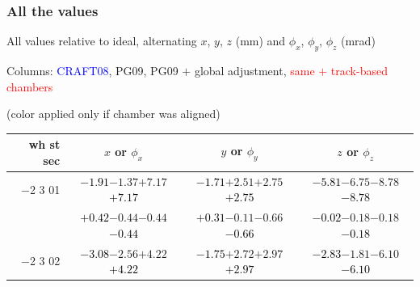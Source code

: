 \documentclass[compress]{beamer}
\begin{document}
\begin{frame}
\frametitle{All the values}
\tiny

All values relative to ideal, alternating $x$, $y$, $z$ (mm) and $\phi_x$, $\phi_y$, $\phi_z$ (mrad)

Columns: \textcolor{blue}{CRAFT08}, PG09, PG09 $+$ global adjustment, \textcolor{red}{same $+$ track-based chambers}

\hfill (color applied only if chamber was aligned)

\vfill
\renewcommand{\arraystretch}{1.1}
\begin{tabular}{r | c | c | c}
wh st sec & $x$ or $\phi_x$ & $y$ or $\phi_y$ & $z$ or $\phi_z$ \\\hline
$-$2 3 01 & \textcolor{black}{$-1.91$}\hspace{0.1 cm}$-1.37$\hspace{0.1 cm}$+7.17$\hspace{0.1 cm}\textcolor{black}{$+7.17$} & \textcolor{black}{$-1.71$}\hspace{0.1 cm}$+2.51$\hspace{0.1 cm}$+2.75$\hspace{0.1 cm}\textcolor{black}{$+2.75$} & \textcolor{black}{$-5.81$}\hspace{0.1 cm}$-6.75$\hspace{0.1 cm}$-8.78$\hspace{0.1 cm}\textcolor{black}{$-8.78$} \\
          & \textcolor{black}{$+0.42$}\hspace{0.1 cm}$-0.44$\hspace{0.1 cm}$-0.44$\hspace{0.1 cm}\textcolor{black}{$-0.44$} & \textcolor{black}{$+0.31$}\hspace{0.1 cm}$-0.11$\hspace{0.1 cm}$-0.66$\hspace{0.1 cm}\textcolor{black}{$-0.66$} & \textcolor{black}{$-0.02$}\hspace{0.1 cm}$-0.18$\hspace{0.1 cm}$-0.18$\hspace{0.1 cm}\textcolor{black}{$-0.18$} \\
$-$2 3 02 & \textcolor{black}{$-3.08$}\hspace{0.1 cm}$-2.56$\hspace{0.1 cm}$+4.22$\hspace{0.1 cm}\textcolor{black}{$+4.22$} & \textcolor{black}{$-1.75$}\hspace{0.1 cm}$+2.72$\hspace{0.1 cm}$+2.97$\hspace{0.1 cm}\textcolor{black}{$+2.97$} & \textcolor{black}{$-2.83$}\hspace{0.1 cm}$-1.81$\hspace{0.1 cm}$-6.10$\hspace{0.1 cm}\textcolor{black}{$-6.10$} \\

\end{tabular}
\end{frame}
\end{document}
